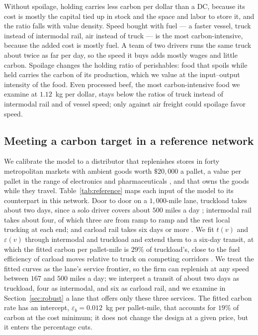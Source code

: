 \documentclass[11pt]{article}
\numberwithin{proposition}{section}
\theoremstyle{definition}
\theoremstyle{remark}
\theoremstyle{plain}
\begin{document}
Without spoilage, holding carries less carbon per dollar than a DC, because its cost is mostly
the capital tied up in stock and the space and labor to store it, and the ratio falls with value density. Speed bought with fuel ---
a faster vessel, truck instead of intermodal rail, air instead of truck --- is the most carbon-intensive, because
the added cost is mostly fuel. A team of two drivers runs the same truck about twice as far per day, so the
speed it buys adds mostly wages and little carbon. Spoilage changes the holding ratio of perishables: food that
spoils while held carries the carbon of its production, which we value at the input--output intensity of the
food. Even processed beef, the most carbon-intensive food we examine at $1.12$~kg per dollar, stays below the ratios
of truck instead of intermodal rail and of vessel speed; only against air freight could spoilage favor speed. 

\subsection{Meeting a carbon target in a reference network}\label{sec:network}

We calibrate the model to a distributor that replenishes stores in forty metropolitan markets with ambient goods
worth $\$20{,}000$ a pallet, a value per pallet in the range of electronics and pharmaceuticals
\citep{faf2023framework}, and that owns the goods while they travel. Table~\ref{tab:reference} maps each input
of the model to its counterpart in this network. Door to door on a $1{,}000$-mile lane, truckload takes about two
days, since a solo driver covers about $500$ miles a day \citep{fra2013truck}; intermodal rail takes about four, of
which three are from ramp to ramp and the rest local trucking at each end; and carload rail takes six days or more
\citep{kwon1995trip}. We fit $t(v)$ and $\varepsilon(v)$ through intermodal and truckload and extend them to a
six-day transit, at which the fitted carbon per pallet-mile is $29\%$ of truckload's, close to the fuel
efficiency of carload moves relative to truck on competing corridors \citep{fra2009fuel}. We treat the fitted
curves as the lane's service frontier, so the firm can replenish at any speed between $167$ and $500$ miles a
day; we interpret a transit of about two days as truckload, four as intermodal, and six as carload rail, and we
examine in Section~\ref{sec:robust} a lane that offers only these three services. The fitted carbon rate has an
intercept, $\varepsilon_b=0.012$~kg per pallet-mile, that accounts for $19\%$ of carbon at the cost minimum; it
does not change the design at a given price, but it enters the percentage cuts. 
\end{document}
